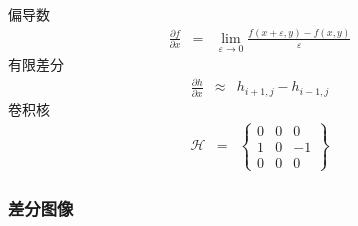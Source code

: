 \documentclass{beamer}
\begin{document}
{{\begin{frame}
  偏导数
  \begin{eqnarray*}
    \frac{\partial f}{\partial x} & = & \lim_{\varepsilon \rightarrow 0}
    \frac{f (x + \varepsilon, y) - f (x, y)}{\varepsilon}
  \end{eqnarray*}
  有限差分
  \begin{eqnarray*}
    \frac{\partial h}{\partial x} & \approx & h_{i + 1, j} - h_{i - 1, j}
  \end{eqnarray*}
  卷积核
  \begin{eqnarray*}
    \mathcal{H} & = & \left\{ \begin{array}{lll}
      0 & 0 & 0\\
      1 & 0 & - 1\\
      0 & 0 & 0
    \end{array} \right\}
  \end{eqnarray*}
\end{frame}}{\begin{frame}
  \frametitle{差分图像}
  
  {\hspace{3em}}
  

\end{frame}}}
\end{document}
